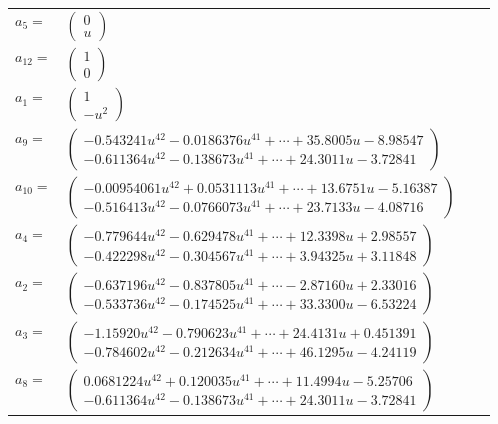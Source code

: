 \documentclass[1p]{elsarticle_modified}
\theoremstyle{definition}
\begin{document}
\begin{tabular}{m{7pt} m{180pt} m{7pt} m{180pt} }
\flushright $a_{5}=$&$\begin{pmatrix}0\\u\end{pmatrix}$ \\
\flushright $a_{12}=$&$\begin{pmatrix}1\\0\end{pmatrix}$ \\
\flushright $a_{1}=$&$\begin{pmatrix}1\\- u^2\end{pmatrix}$ \\
\flushright $a_{9}=$&$\begin{pmatrix}-0.543241 u^{42}-0.0186376 u^{41}+\cdots+35.8005 u-8.98547\\-0.611364 u^{42}-0.138673 u^{41}+\cdots+24.3011 u-3.72841\end{pmatrix}$ \\
\flushright $a_{10}=$&$\begin{pmatrix}-0.00954061 u^{42}+0.0531113 u^{41}+\cdots+13.6751 u-5.16387\\-0.516413 u^{42}-0.0766073 u^{41}+\cdots+23.7133 u-4.08716\end{pmatrix}$ \\
\flushright $a_{4}=$&$\begin{pmatrix}-0.779644 u^{42}-0.629478 u^{41}+\cdots+12.3398 u+2.98557\\-0.422298 u^{42}-0.304567 u^{41}+\cdots+3.94325 u+3.11848\end{pmatrix}$ \\
\flushright $a_{2}=$&$\begin{pmatrix}-0.637196 u^{42}-0.837805 u^{41}+\cdots-2.87160 u+2.33016\\-0.533736 u^{42}-0.174525 u^{41}+\cdots+33.3300 u-6.53224\end{pmatrix}$ \\
\flushright $a_{3}=$&$\begin{pmatrix}-1.15920 u^{42}-0.790623 u^{41}+\cdots+24.4131 u+0.451391\\-0.784602 u^{42}-0.212634 u^{41}+\cdots+46.1295 u-4.24119\end{pmatrix}$ \\
\flushright $a_{8}=$&$\begin{pmatrix}0.0681224 u^{42}+0.120035 u^{41}+\cdots+11.4994 u-5.25706\\-0.611364 u^{42}-0.138673 u^{41}+\cdots+24.3011 u-3.72841\end{pmatrix}$ \\

\end{tabular}
\end{document}
